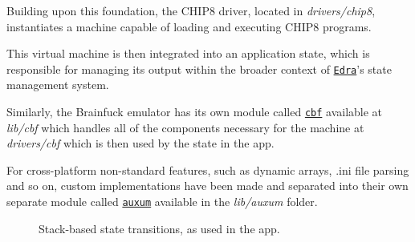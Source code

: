\par Building upon this foundation, the CHIP8 driver, located in \textit{drivers/chip8}, instantiates a machine capable of loading and executing CHIP8 programs.

\par This virtual machine is then integrated into an application state, which is responsible for managing its output within the broader context of \href{https://github.com/solomonarul/edra}{\texttt{Edra}}'s state management system.

\par Similarly, the Brainfuck emulator has its own module called \href{https://github.com/solomonarul/cbf}{\texttt{cbf}} available at \textit{lib/cbf} which handles all of the components necessary for the machine at \textit{drivers/cbf} which is then used by the state in the app.

\par For cross-platform non-standard features, such as dynamic arrays, .ini file parsing and so on, custom implementations have been made and separated into their own separate module called \href{https://github.com/solomonarul/auxum}{\texttt{auxum}} available in the \textit{lib/auxum} folder.

\begin{figure}[htbp]
\centering
{}
\caption{Stack-based state transitions, as used in the app.}\label{fig:state_stack}
\end{figure}

